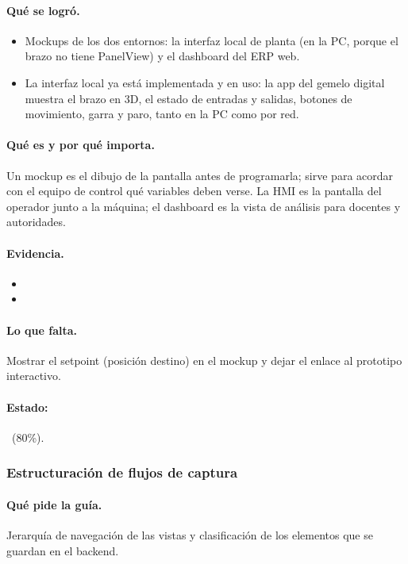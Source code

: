 \documentclass[a4paper,11pt]{article}
\begin{document}
\paragraph{Qué se logró.}
\begin{itemize}
\item Mockups de los dos entornos: la interfaz local de planta (en la PC, porque el brazo no tiene PanelView) y el dashboard del ERP web.
\item La interfaz local ya está implementada y en uso: la app del gemelo digital muestra el brazo en 3D, el estado de entradas y salidas, botones de movimiento, garra y paro, tanto en la PC como por red.
\end{itemize}
\paragraph{Qué es y por qué importa.} Un mockup es el dibujo de la pantalla antes de programarla; sirve para acordar con el equipo de control qué variables deben verse. La HMI es la pantalla del operador junto a la máquina; el dashboard es la vista de análisis para docentes y autoridades.
\paragraph{Evidencia.}
\begin{itemize}\small
\item {}
\item {}
\end{itemize}
\paragraph{Lo que falta.} Mostrar el setpoint (posición destino) en el mockup y dejar el enlace al prototipo interactivo.
\paragraph{Estado:} \parcial~(80\%).
\subsubsection{Estructuración de flujos de captura}
\paragraph{Qué pide la guía.} Jerarquía de navegación de las vistas y clasificación de los elementos que se guardan en el backend.
\end{document}
